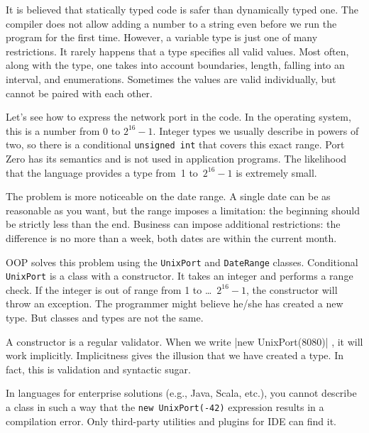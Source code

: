 \label{type-and-pred}


It is believed that statically typed code is safer than dynamically typed one. The compiler does not allow adding a number to a string even before we run the program for the first time. However, a variable type is just one of many restrictions. It rarely happens that a type specifies all valid values. Most often, along with the type, one takes into account boundaries, length, falling into an interval, and enumerations. Sometimes the values are valid individually, but cannot be paired with each other.


Let's see how to express the network port in the code. In the operating system, this is a number from 0 to $2^{16}-1$. Integer types we usually describe in powers of two, so there is a conditional \verb|unsigned int| that covers this exact range. Port Zero has its semantics and is not used in application programs. The likelihood that the language provides a type from~1 to~$2^{16}-1$ is extremely small.

The problem is more noticeable on the date range. A single date can be as reasonable as you want, but the range imposes a limitation: the beginning should be strictly less than the end. Business can impose additional restrictions: the difference is no more than a week, both dates are within the current month.
 

OOP solves this problem using the \verb|UnixPort| and \verb|DateRange| classes. Conditional \verb|UnixPort| is a class with a constructor. It takes an integer and performs a range check. If the integer is out of range from 1 to \dots~$2^{16}-1$, the constructor will throw an exception. The programmer might believe he/she has created a new type. But classes and types are not the same. 

A constructor is a regular validator. When we write \spverb|new UnixPort(8080)| , it will work implicitly. Implicitness gives the illusion that we have created a type. In fact, this is validation and syntactic sugar.


In languages for enterprise solutions (e.g., Java, Scala, etc.), you cannot describe a class in such a way that the \verb|new UnixPort(-42)| expression results in a compilation error. Only third-party utilities and plugins for IDE can find it.

